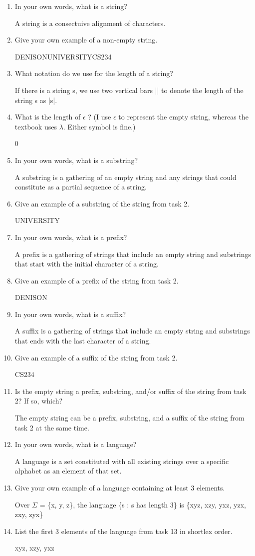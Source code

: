\documentclass[10pt]{article}
\begin{document}
\begin{enumerate}
  \item In your own words, what is a string?

        A string is a consectuive alignment of characters.
  \item Give your own example of a non-empty string.

        DENISONUNIVERSITYCS234
  \item What notation do we use for the length of a string?

        If there is a string s, we use two vertical bars || to denote the length of the string s as |s|.
  \item What is the length of $\epsilon$ ? (I use $\epsilon$ to represent the empty string, whereas the textbook uses $\lambda$. Either symbol is fine.)

        0
  \item In your own words, what is a substring?

        A substring is a gathering of an empty string and any strings that could constitute as a partial sequence of a string.
  \item Give an example of a substring of the string from task 2.

        UNIVERSITY
  \item In your own words, what is a prefix?

        A prefix is a gathering of strings that include an empty string and substrings that start with the initial character of a string.
  \item Give an example of a prefix of the string from task 2.

        DENISON
  \item In your own words, what is a suffix?

        A suffix is a gathering of strings that include an empty string and substrings that ends with the last character of a string.
  \item Give an example of a suffix of the string from task 2.

        CS234
  \item Is the empty string a prefix, substring, and/or suffix of the string from task 2? If so, which?

        The empty string can be a prefix, substring, and a suffix of the string from task 2 at the same time.
  \item In your own words, what is a language?


        A language is a set constituted with all existing strings over a specific alphabet as an element of that set.

  \item Give your own example of a language containing at least 3 elements.

        Over $\Sigma$ = \{x, y, z\}, the language \{s : s has length 3\} is \{xyz, xzy, yxz, yzx, zxy, zyx\}
  \item List the first 3 elements of the language from task 13 in shortlex order.

        xyz, xzy, yxz


\end{enumerate}
\end{document}

